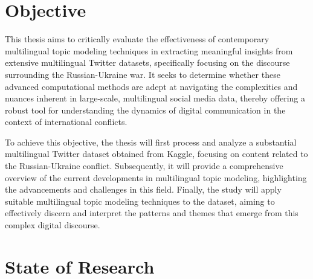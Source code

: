 \documentclass[
    11pt,
    a4paper,
    egregdoesnotlikesansseriftitles,
    toc=chapterentrywithdots,
    oneside,openright,
    titlepage,
    parskip=half,
    headings=normal,  %
    listof=totoc,
    bibliography=totoc,
    index=totoc,
    captions=tableheading,  %
    chapterprefix,
    listof=flat,
    final
]{scrbook}
\begin{document}
{\let\clearpage\relax \chapter{Objective}}
This thesis aims to critically evaluate the effectiveness of contemporary multilingual topic modeling techniques in extracting meaningful insights from extensive multilingual Twitter datasets, specifically focusing on the discourse surrounding the Russian-Ukraine war. It seeks to determine whether these advanced computational methods are adept at navigating the complexities and nuances inherent in large-scale, multilingual social media data, thereby offering a robust tool for understanding the dynamics of digital communication in the context of international conflicts.

To achieve this objective, the thesis will first process and analyze a substantial multilingual Twitter dataset obtained from Kaggle, focusing on content related to the Russian-Ukraine conflict. Subsequently, it will provide a comprehensive overview of the current developments in multilingual topic modeling, highlighting the advancements and challenges in this field. Finally, the study will apply suitable multilingual topic modeling techniques to the dataset, aiming to effectively discern and interpret the patterns and themes that emerge from this complex digital discourse.

{\let\clearpage\relax \chapter{State of Research}}
\end{document}
